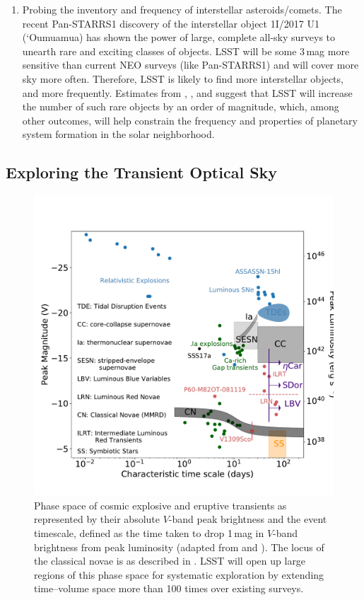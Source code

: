 \begin{enumerate}
\item Probing the inventory and frequency of  interstellar
  asteroids/comets. The recent Pan-STARRS1 discovery of the interstellar object
1I/2017 U1 (`Oumuamua)
\citep{2017MPEC....U..181B} has shown the power
of large, complete all-sky surveys to unearth
rare and exciting classes of objects. LSST will be some 3\,mag more sensitive
than  current NEO surveys (like Pan-STARRS1) and will cover more sky more
often. Therefore, LSST is likely to find more interstellar objects, and more frequently.
Estimates from  \citet{2016ApJ...825...51C},  \citet{2017AJ....153..133E}, and \citet{2017ApJ...850L..38T} suggest that LSST will increase the number of  such rare objects by an order of magnitude, which, among other outcomes, will help
constrain the frequency and properties of planetary system formation in the solar neighborhood.
\end{enumerate}


\subsection{Exploring the Transient Optical Sky}


\begin{figure}
\includegraphics[width=1.0\hsize,clip]{taumv_updated}
\caption{Phase space of cosmic explosive and eruptive transients
  as represented by their absolute $V$-band peak brightness and the
  event timescale, defined as the time taken to drop 1\,mag in
  $V$-band brightness from peak luminosity (adapted from \citet{2007Natur.447..458K}
  and \citet{2011PhDT........35K}).  The locus of the classical
  novae
is as described in \citet{1995ApJ...452..704D}.  LSST
  will open up large regions of this phase space for systematic
  exploration by extending time--volume space more than 100 times over
  existing surveys.}
\label{Fig:shri}
\end{figure}

